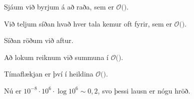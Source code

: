 {
}

{
	{
		\item<1-> Sjáum við byrjum á að raða, sem er $\mathcal{O}($\onslide<2->{$n \log n$}$)$.
		\item<3-> Við teljum síðan hvað hver tala kemur oft fyrir, sem er $\mathcal{O}($\onslide<4->{$\ n\ $}$)$.
		\item<5-> Síðan röðum við aftur.
		\item<6-> Að lokum reiknum við summuna í $\mathcal{O}($\onslide<7->{$\ n\ $}$)$.
		\item<8-> Tímaflækjan er því í heildina $\mathcal{O}($\onslide<9->{$n \log n$}$)$.
		\item<10-> Nú er $10^{-8} \cdot 10^6 \cdot \log 10^6 \sim 0,2$, svo þessi lausn er nógu hröð.
	}
}


{
}


